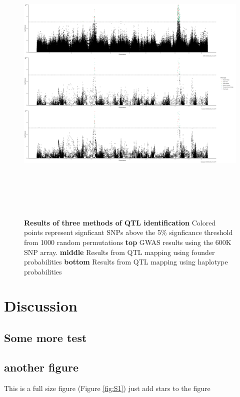 \documentclass[article,9pt,twocolumn,twoside]{rilabRxiv}
\begin{document}
\begin{figure}[hb!]
\includegraphics[width=\textwidth,height=14cm]{figures/Methods_Fig3.png}
\caption{\textbf{Results of three methods of QTL identification} Colored points represent signficant SNPs above the 5\% signficance threshold from 1000 random permutations \textbf{top} GWAS results using the 600K SNP array. \textbf{middle} Results from QTL mapping using founder probabilities \textbf{bottom} Results from QTL mapping using haplotype probabilities}
\label{fig:figure3}
\end{figure}


\section{Discussion}
\subsection{Some more test}
\blindtext
\blindtext


\subsection{another figure}
This is a full size figure (Figure \ref{fig:S1}) just add stars to the figure
\end{document}
